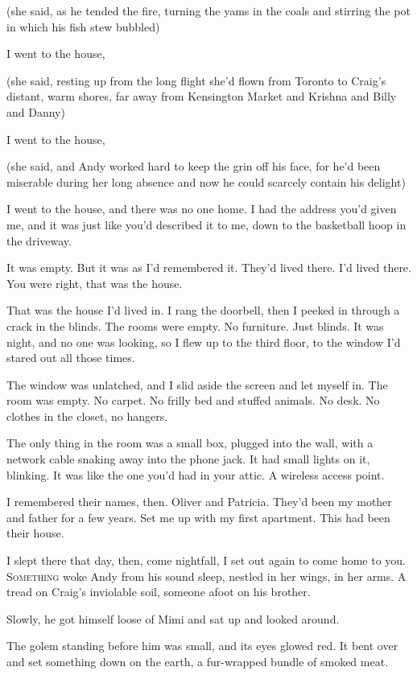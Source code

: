 (she said, as he tended the fire, turning the yams in the coals and
stirring the pot in which his fish stew bubbled)

I went to the house,

(she said, resting up from the long flight she'd flown from Toronto to
Craig's distant, warm shores, far away from Kensington Market and
Krishna and Billy and Danny)

I went to the house,

(she said, and Andy worked hard to keep the grin off his face, for
he'd been miserable during her long absence and now he could scarcely
contain his delight)

I went to the house, and there was no one home.  I had the address
you'd given me, and it was just like you'd described it to me, down to
the basketball hoop in the driveway.

It was empty.  But it was as I'd remembered it.  They'd lived there. 
I'd lived there.  You were right, that was the house.

That was the house I'd lived in.  I rang the doorbell, then I peeked
in through a crack in the blinds.  The rooms were empty.  No
furniture.  Just blinds.  It was night, and no one was looking, so I
flew up to the third floor, to the window I'd stared out all those
times.

The window was unlatched, and I slid aside the screen and let myself
in.  The room was empty.  No carpet.  No frilly bed and stuffed
animals.  No desk.  No clothes in the closet, no hangers.

The only thing in the room was a small box, plugged into the wall,
with a network cable snaking away into the phone jack.  It had small
lights on it, blinking.  It was like the one you'd had in your attic. 
A wireless access point.

I remembered their names, then.  Oliver and Patricia.  They'd been my
mother and father for a few years.  Set me up with my first apartment. 
This had been their house. 

I slept there that day, then, come nightfall, I set out again to come
home to you.
\\
\lettrine[lines=3, lhang=.5, nindent=0pt, findent=2pt]{S}{omething} woke Andy from his sound sleep, nestled in her wings, in her
arms.  A tread on Craig's inviolable soil, someone afoot on his
brother.

Slowly, he got himself loose of Mimi and sat up and looked around. 

The golem standing before him was small, and its eyes glowed red.  It
bent over and set something down on the earth, a fur-wrapped bundle of
smoked meat. 

